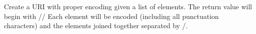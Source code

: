 Create a URI with proper encoding given a list of elements. The return value will begin with // Each element will be encoded
(including all punctuation characters) and the elements joined together separated by /.
